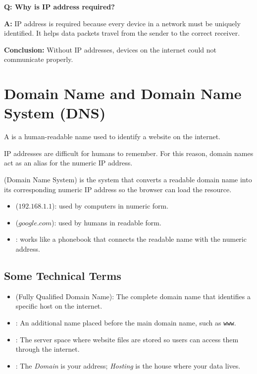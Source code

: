 \begin{questionanswerbox}
\textbf{Q: Why is IP address required?}

\medskip
\textbf{A:}  
IP address is required because every device in a network must be uniquely identified. It helps data packets travel from the sender to the correct receiver.

\medskip
\textbf{Conclusion:}  
Without IP addresses, devices on the internet could not communicate properly.
\end{questionanswerbox}


\section{Domain Name and Domain Name System (DNS)}

\begin{definitionbox}
    A  is a human-readable name used to identify a website on the internet.
\end{definitionbox}

\Note IP addresses are difficult for humans to remember. For this reason, domain names act as an alias for the numeric IP address.

\begin{definitionbox}[DNS]
     (Domain Name System) is the system that converts a readable domain name into its corresponding numeric IP address so the browser can load the resource.
\end{definitionbox}

\begin{summarybox}
    \begin{itemize}
        \item {} ($192.168.1.1$): used by computers in numeric form.
        \item {} ($google.com$): used by humans in readable form.
        \item {}: works like a phonebook that connects the readable name with the numeric address.
    \end{itemize}
\end{summarybox}

\subsection{Some Technical Terms}
\begin{itemize}
    \item {} (Fully Qualified Domain Name): The complete domain name that identifies a specific host on the internet.
    \item {}: An additional name placed before the main domain name, such as \texttt{www}.
    \item {}: The server space where website files are stored so users can access them through the internet.
    \item {}: The \textit{Domain} is your address; \textit{Hosting} is the house where your data lives.
\end{itemize}

